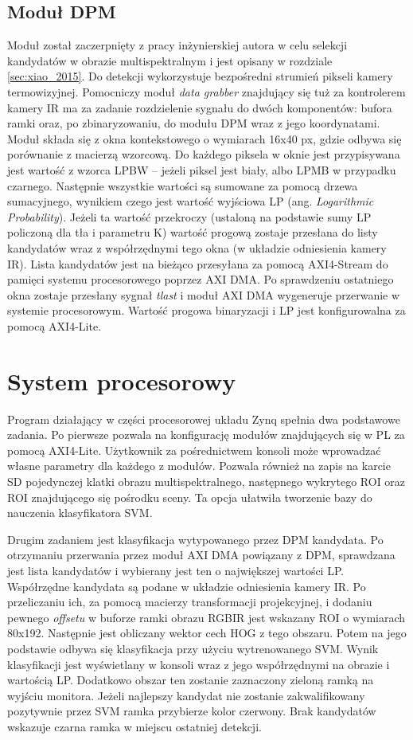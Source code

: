 \subsection{Moduł DPM}
Moduł został zaczerpnięty z pracy inżynierskiej autora w celu selekcji kandydatów w obrazie multispektralnym i jest opisany w rozdziale \ref {sec:xiao_2015}.  Do detekcji wykorzystuje bezpośredni strumień pikseli kamery termowizyjnej. Pomocniczy moduł \textit{data grabber} znajdujący się tuż za kontrolerem kamery IR ma za zadanie rozdzielenie sygnału do dwóch komponentów: bufora ramki oraz, po zbinaryzowaniu, do modułu DPM wraz z jego koordynatami. Moduł składa się z okna kontekstowego o wymiarach 16x40 px, gdzie odbywa się porównanie z macierzą wzorcową. Do każdego piksela w oknie jest przypisywana jest wartość z wzorca LPBW – jeżeli piksel jest biały, albo LPMB w przypadku czarnego. Następnie wszystkie wartości są sumowane za pomocą drzewa sumacyjnego, wynikiem czego jest wartość wyjściowa LP (ang. \textit{Logarithmic Probability}). Jeżeli ta wartość przekroczy (ustaloną na podstawie sumy LP policzoną dla tła i parametru K) wartość progową zostaje przesłana do listy kandydatów wraz z współrzędnymi tego okna (w układzie odniesienia kamery IR). Lista kandydatów jest na bieżąco przesyłana za pomocą AXI4-Stream do pamięci systemu procesorowego poprzez AXI DMA. Po sprawdzeniu ostatniego okna zostaje przesłany sygnał \textit{tlast} i moduł AXI DMA wygeneruje przerwanie w systemie procesorowym. Wartość progowa binaryzacji i LP jest konfigurowalna za pomocą AXI4-Lite.
\section{System procesorowy}
Program działający w części procesorowej układu Zynq spełnia dwa podstawowe zadania. Po pierwsze pozwala na konfigurację modułów znajdujących się w PL za pomocą AXI4-Lite. Użytkownik za pośrednictwem konsoli może wprowadzać własne parametry dla każdego z modułów. Pozwala również na zapis na karcie SD pojedynczej klatki obrazu multispektralnego, następnego wykrytego ROI oraz ROI znajdującego się pośrodku sceny. Ta opcja ułatwiła tworzenie bazy do nauczenia klasyfikatora SVM. 

Drugim zadaniem jest klasyfikacja wytypowanego przez DPM kandydata. Po otrzymaniu przerwania przez moduł AXI DMA powiązany z DPM, sprawdzana jest lista kandydatów i wybierany jest ten o największej wartości LP. Współrzędne kandydata są podane w układzie odniesienia kamery IR. Po przeliczaniu ich, za pomocą macierzy transformacji projekcyjnej, i dodaniu pewnego \textit{offsetu} w buforze ramki obrazu RGBIR jest wskazany ROI o wymiarach 80x192. Następnie jest obliczany wektor cech HOG z tego obszaru. Potem na jego podstawie odbywa się klasyfikacja przy użyciu wytrenowanego SVM. Wynik klasyfikacji jest wyświetlany w konsoli wraz z jego współrzędnymi na obrazie i wartością LP. Dodatkowo obszar ten zostanie zaznaczony zieloną ramką na wyjściu monitora. Jeżeli najlepszy kandydat nie zostanie zakwalifikowany pozytywnie przez SVM ramka przybierze kolor czerwony. Brak kandydatów wskazuje czarna ramka w miejscu ostatniej detekcji. 
